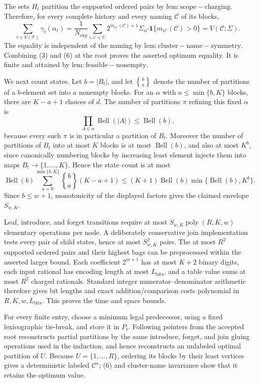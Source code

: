 The sets \(H_t\) partition the supported ordered pairs by \(\mathrm{lem:scope-charging}\).  Therefore, for every complete history and every naming \(\mathcal C\) of its blocks,
\[
 \sum_{t\in V(\mathcal T)}\gamma_t(\alpha_t)
 =\frac{1}{N_{\exp}}\sum_{i,i'\in U}
 2^{m_{ii'}(\mathcal C)+1}\Sigma_{ii'}
 \mathbf 1\{m_{ii'}(\mathcal C)>0\}
 =V(\mathcal C;\Sigma).
\tag{6}
\]
The equality is independent of the naming by \(\mathrm{lem:cluster-name-symmetry}\).  Combining (3) and (6) at the root proves the asserted optimum equality.  It is finite and attained by \(\mathrm{lem:feasible-nonempty}\).

We next count states.  Let \(b=|B_t|\), and let \(\genfrac{\{} {\}}{0pt}{}{b}{a}\) denote the number of partitions of a \(b\)-element set into \(a\) nonempty blocks.  For an \(\alpha\) with \(a\le\min\{b,K\}\) blocks, there are \(K-a+1\) choices of \(d\).  The number of partitions \(\pi\) refining this fixed \(\alpha\) is
\[
 \prod_{A\in\alpha}\operatorname{Bell}(|A|)\le\operatorname{Bell}(b),
\]
because every such \(\pi\) is in particular a partition of \(B_t\).  Moreover the number of partitions of \(B_t\) into at most \(K\) blocks is at most \(\operatorname{Bell}(b)\), and also at most \(K^b\), since canonically numbering blocks by increasing least element injects them into maps \(B_t\to\{1,\ldots,K\}\).  Hence the state count is at most
\[
 \operatorname{Bell}(b)
 \sum_{a=0}^{\min\{b,K\}}
 \genfrac{\{} {\}}{0pt}{}{b}{a}(K-a+1)
 \le (K+1)\operatorname{Bell}(b)
       \min\{\operatorname{Bell}(b),K^b\}.
\tag{7}
\]
Since \(b\le w+1\), monotonicity of the displayed factors gives the claimed envelope \(S_{w,K}\).

Leaf, introduce, and forget transitions require at most \(S_{w,K}\operatorname{poly}(R,K,w)\) elementary operations per node.  A deliberately conservative join implementation tests every pair of child states, hence at most \(S_{w,K}^2\) pairs.  The at most \(R^2\) supported ordered pairs and their highest bags can be preprocessed within the asserted larger bound.  Each coefficient \(2^{m+1}\) has at most \(K+2\) binary digits, each input rational has encoding length at most \(L_{\mathrm{bits}}\), and a table value sums at most \(R^2\) charged rationals.  Standard integer numerator--denominator arithmetic therefore gives bit lengths and exact addition/comparison costs polynomial in \(R,K,w,L_{\mathrm{bits}}\).  This proves the time and space bounds.

For every finite entry, choose a minimum legal predecessor, using a fixed lexicographic tie-break, and store it in \(P_t\).  Following pointers from the accepted root reconstructs partial partitions by the same introduce, forget, and join gluing operations used in the induction, and hence reconstructs an unlabeled optimal partition of \(U\).  Because \(U=\{1,\ldots,R\}\), ordering its blocks by their least vertices gives a deterministic labeled \(\mathcal C^\star\); (6) and cluster-name invariance show that it retains the optimum value.

